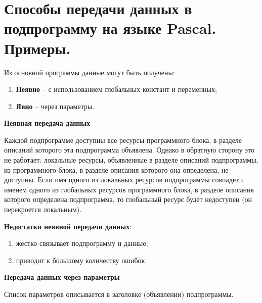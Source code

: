 



\newpage\section{Способы передачи данных в подпрограмму на языке Pascal. Примеры. }

\begin{myquote}
            
\end{myquote}

Из основной программы данные могут быть получены:

\begin{enumerate}
\item	{\bf{Неявно}} – с использованием глобальных констант и переменных;
\item	{\bf{Явно}} – через параметры.
\end{enumerate}

{\bf{Неявная передача данных}}

Каждой подпрограмме доступны все ресурсы программного блока, в разделе описаний которого эта подпрограмма объявлена. Однако в обратную сторону это не работает: локальные ресурсы, объявленные в разделе описаний подпрограммы, из программного блока, в разделе описания которого она определена, не доступны. Если имя одного из локальных ресурсов подпрограммы совпадет с именем одного из глобальных ресурсов программного блока, в разделе описания которого определена подпрограмма, то глобальный ресурс будет недоступен (он перекроется локальным).

{\bf{Недостатки неявной передачи данных}}:

\begin{enumerate}
    \item жестко связывает подпрограмму и данные;
    \item приводит к большому количеству ошибок.
\end{enumerate}

{\bf Передача данных через параметры}

Список параметров описывается в заголовке (объявлении) подпрограммы.
 

